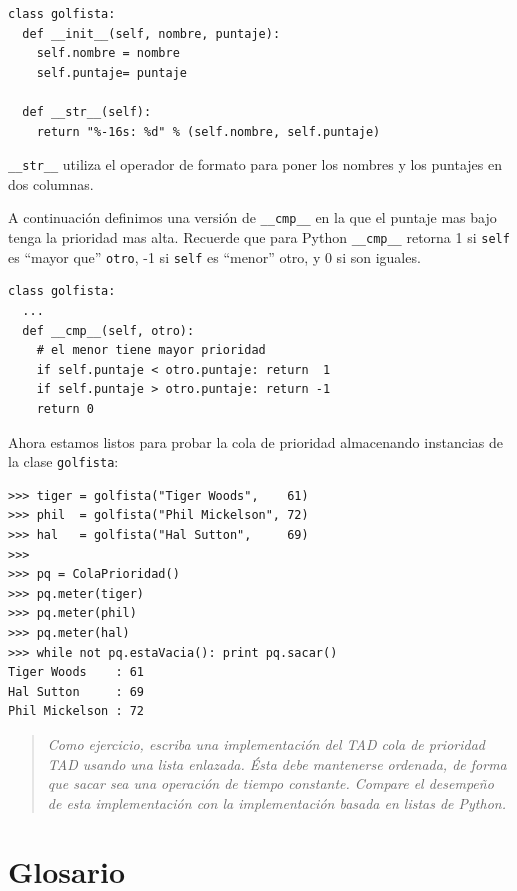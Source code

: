 \beforeverb
\begin{verbatim}
class golfista:
  def __init__(self, nombre, puntaje):
    self.nombre = nombre
    self.puntaje= puntaje

  def __str__(self):
    return "%-16s: %d" % (self.nombre, self.puntaje)
\end{verbatim}
\afterverb
%
\texttt{\_\_str\_\_} utiliza el operador de formato
para poner los nombres y los puntajes en dos columnas.


A continuación definimos una versión de \texttt{\_\_cmp\_\_} 
en la que el puntaje mas bajo tenga la prioridad mas alta. 
Recuerde que para Python  \texttt{\_\_cmp\_\_} retorna 
1 si \texttt{self} es ``mayor que'' \texttt{otro}, -1 si \texttt{self}
es ``menor'' otro, y 0 si son iguales.

\beforeverb
\begin{verbatim}
class golfista:
  ...
  def __cmp__(self, otro):
    # el menor tiene mayor prioridad
    if self.puntaje < otro.puntaje: return  1   
    if self.puntaje > otro.puntaje: return -1
    return 0
\end{verbatim}
\afterverb
%
Ahora estamos listos para probar la cola de prioridad almacenando 
instancias de la clase \texttt{golfista}:

\beforeverb
\begin{verbatim}
>>> tiger = golfista("Tiger Woods",    61)
>>> phil  = golfista("Phil Mickelson", 72)
>>> hal   = golfista("Hal Sutton",     69)
>>>
>>> pq = ColaPrioridad()
>>> pq.meter(tiger)
>>> pq.meter(phil)
>>> pq.meter(hal)
>>> while not pq.estaVacia(): print pq.sacar()
Tiger Woods    : 61
Hal Sutton     : 69
Phil Mickelson : 72
\end{verbatim}
\afterverb

\begin{quote}
{\em Como ejercicio, escriba una implementación del TAD cola de prioridad TAD 
usando una lista enlazada. Ésta debe mantenerse ordenada, de forma que sacar
sea una operación de tiempo constante.  Compare el desempeño de esta
implementación con la implementación basada en listas de Python.}
\end{quote}


\section{Glosario}

